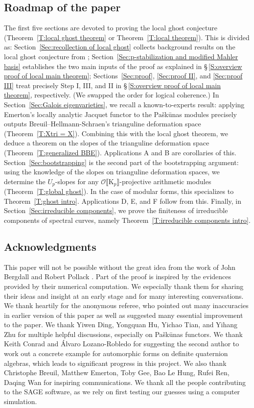 \documentclass[12pt]{amsart}
\theoremstyle{definition}
\numberwithin{equation}{subsection}
\def\calO{\mathcal{O}}
\def\rmK{\mathrm{K}}
\begin{document}
\subsection*{Roadmap of the paper}

The first five sections are devoted to proving the local ghost conjecture (Theorem~\ref{T:local ghost theorem} or Theorem~\ref{T:local theorem}). This is divided as: Section~\ref{Sec:recollection of local ghost} collects background results on the local ghost conjecture from \cite{liu-truong-xiao-zhao}; Section~\ref{Sec:p-stabilization and modified Mahler basis} establishes the two main inputs of the proof as explained in \S\,\ref{S:overview proof of local main theorem}; Sections~\ref{Sec:proof}, \ref{Sec:proof II}, and \ref{Sec:proof III} treat precisely Step I, III, and II in  \S\,\ref{S:overview proof of local main theorem}, respectively. (We swapped the order for logical coherence.)
In Section~\ref{Sec:Galois eigenvarieties}, we recall a known-to-experts result: applying Emerton's locally analytic Jacquet functor to the Pa\v sk\=unas modules precisely outputs Breuil--Hellmann-Schraen's trianguline deformation space (Theorem~\ref{T:Xtri = X}). Combining this with the local ghost theorem, we deduce a theorem on the slopes of the trianguline deformation space (Theorem~\ref{T:generalized BBE}). Applications A and B are corollaries of this.
Section~\ref{Sec:bootstrapping} is the second part of the bootstrapping argument: using the knowledge of the slopes on trianguline deformation spaces, we determine the $U_p$-slopes for any $\calO\llbracket\rmK_p\rrbracket$-projective arithmetic modules (Theorem~\ref{T:global ghost}). In the case of modular forms, this specializes to Theorem~\ref{T:ghost intro}.  Applications D, E, and F follow from this.
Finally, in Section~\ref{Sec:irreducible components}, we prove the finiteness of irreducible components of spectral curves, namely Theorem~\ref{T:irreducible components intro}.


\subsection*{Acknowledgments}
This paper will not be possible without the great idea from the work of John Bergdall and Robert Pollack \cite{bergdall-pollack}.
Part of the proof is inspired by the evidences provided by their numerical computation.  We especially thank them for sharing their ideas and insight at an early stage and for many interesting conversations. We thank heartily for the anonymous referee, who pointed out many inaccuracies in earlier version of this paper as well as suggested many essential improvement to the paper.
We thank Yiwen Ding, Yongquan Hu, Yichao Tian, and Yihang Zhu for multiple helpful discussions, especially on Pa\v sk\=unas functors. 
We thank Keith Conrad and \'Alvaro Lozano-Robledo for suggesting the second author to work out a concrete example for automorphic forms on definite quaternion algebras, which leads to significant progress in this project.  We also thank Christophe Breuil, Matthew Emerton, Toby Gee, Bao Le Hung, Rufei Ren, Daqing Wan for inspiring communications.
We thank all the people contributing to the SAGE software, as we rely on first testing our guesses using a computer simulation.
\end{document}
